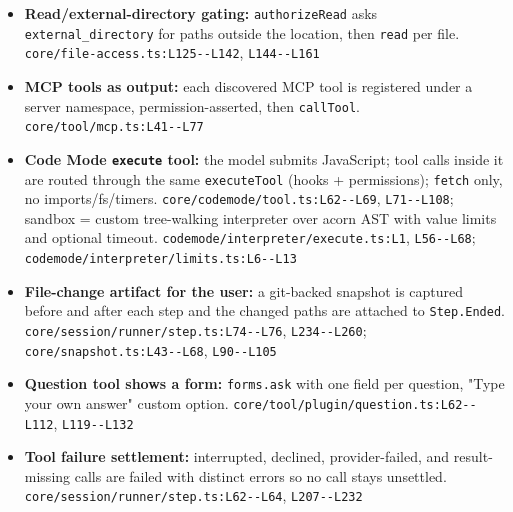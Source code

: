 \begin{itemize}
\item \textbf{Read/external-directory gating:} \texttt{authorizeRead} asks \texttt{external\_\allowbreak{}directory} for paths outside the location, then \texttt{read} per file. \texttt{core/\allowbreak{}file-\allowbreak{}access.\allowbreak{}ts:\allowbreak{}L125-\allowbreak{}-\allowbreak{}L142}, \texttt{L144-\allowbreak{}-\allowbreak{}L161}
\item \textbf{MCP tools as output:} each discovered MCP tool is registered under a server namespace, permission-asserted, then \texttt{callTool}. \texttt{core/\allowbreak{}tool/\allowbreak{}mcp.\allowbreak{}ts:\allowbreak{}L41-\allowbreak{}-\allowbreak{}L77}
\item \textbf{Code Mode \texttt{execute} tool:} the model submits JavaScript; tool calls inside it are routed through the same \texttt{executeTool} (hooks + permissions); \texttt{fetch} only, no imports/fs/timers. \texttt{core/\allowbreak{}codemode/\allowbreak{}tool.\allowbreak{}ts:\allowbreak{}L62-\allowbreak{}-\allowbreak{}L69}, \texttt{L71-\allowbreak{}-\allowbreak{}L108}; sandbox = custom tree-walking interpreter over acorn AST with value limits and optional timeout. \texttt{codemode/\allowbreak{}interpreter/\allowbreak{}execute.\allowbreak{}ts:\allowbreak{}L1}, \texttt{L56-\allowbreak{}-\allowbreak{}L68}; \texttt{codemode/\allowbreak{}interpreter/\allowbreak{}limits.\allowbreak{}ts:\allowbreak{}L6-\allowbreak{}-\allowbreak{}L13}
\item \textbf{File-change artifact for the user:} a git-backed snapshot is captured before and after each step and the changed paths are attached to \texttt{Step.\allowbreak{}Ended}. \texttt{core/\allowbreak{}session/\allowbreak{}runner/\allowbreak{}step.\allowbreak{}ts:\allowbreak{}L74-\allowbreak{}-\allowbreak{}L76}, \texttt{L234-\allowbreak{}-\allowbreak{}L260}; \texttt{core/\allowbreak{}snapshot.\allowbreak{}ts:\allowbreak{}L43-\allowbreak{}-\allowbreak{}L68}, \texttt{L90-\allowbreak{}-\allowbreak{}L105}
\item \textbf{Question tool shows a form:} \texttt{forms.\allowbreak{}ask} with one field per question, "Type your own answer" custom option. \texttt{core/\allowbreak{}tool/\allowbreak{}plugin/\allowbreak{}question.\allowbreak{}ts:\allowbreak{}L62-\allowbreak{}-\allowbreak{}L112}, \texttt{L119-\allowbreak{}-\allowbreak{}L132}
\item \textbf{Tool failure settlement:} interrupted, declined, provider-failed, and result-missing calls are failed with distinct errors so no call stays unsettled. \texttt{core/\allowbreak{}session/\allowbreak{}runner/\allowbreak{}step.\allowbreak{}ts:\allowbreak{}L62-\allowbreak{}-\allowbreak{}L64}, \texttt{L207-\allowbreak{}-\allowbreak{}L232}
\end{itemize}

